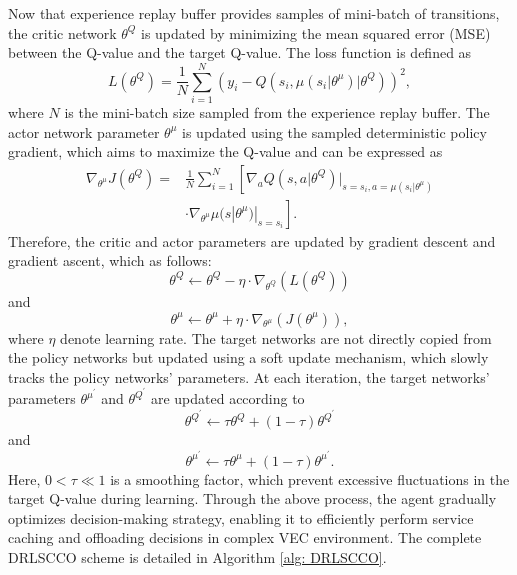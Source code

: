 \documentclass[lettersize,journal]{IEEEtran}
\begin{document}
Now that experience replay buffer provides samples of mini-batch of transitions, 
the critic network $ \theta^{Q} $ is updated by minimizing the mean squared error (MSE) between the  Q-value and the target Q-value. The loss function is defined as
\begin{equation}
	\label{equ: loss function for update critic sitaQ}
	L(\theta^{Q}) = \frac{1}{N}\sum_{i=1}^{N}\left( y_i - Q \left( s_i, \mu\left( s_i|\theta^{\mu} \right)|\theta^{Q} \right) \right)^2,
\end{equation}
where $ N $ is the mini-batch size sampled from the experience replay buffer.
The actor network parameter $ \theta^{\mu}$ is updated using the sampled deterministic  policy gradient, which aims to maximize the Q-value and can be expressed as
\begin{equation}
	\label{equ: policy gradient ascent for update actor sitamu}
	\begin{aligned}
		\nabla_{\theta^{\mu}} J(\theta^{Q})= & \frac{1}{N}\sum_{i=1}^{N}\left[ \nabla_{a}Q\left( s,a|\theta^{Q} \right)|_{s=s_i,a=\mu(s_i|\theta^{\mu})} 	\right.		\\
		& \left. \cdot \nabla_{\theta^{\mu}}\mu (s|\theta^{\mu})|_{s=s_i} \right].
	\end{aligned}
\end{equation}
Therefore, the critic and actor parameters are updated by gradient descent and gradient ascent, which as follows:  
\begin{equation}
	\theta^{Q} \leftarrow \theta^{Q} - \eta \cdot \nabla_{\theta^{Q}}(L(\theta^{Q}))
\end{equation}
and
\begin{equation}
	\theta^{\mu} \leftarrow \theta^{\mu} + \eta \cdot \nabla_{\theta^{\mu}}(J(\theta^{\mu})),
\end{equation}
where $ \eta $ denote learning rate.
The target networks are not directly copied from the policy networks but updated using a soft update mechanism, which slowly tracks the policy networks' parameters. At each iteration, the target networks' parameters $ \theta^{\mu^{\prime}} $ and $ \theta^{Q^{\prime}} $ are updated according to
\begin{equation}
	\label{equ: target1}
	\theta^{Q^{\prime}} \leftarrow \tau \theta^{Q} + (1-\tau)\theta^{Q^{\prime}}
\end{equation}
and
\begin{equation}
	\label{equ: target2}
	\theta^{\mu^{\prime}} \leftarrow \tau \theta^{\mu} + (1-\tau)\theta^{\mu^{\prime}}.
\end{equation}
Here, $ 0 < \tau \ll 1 $ is a smoothing factor, which prevent excessive fluctuations in the target Q-value during learning.  
Through the above process, the agent gradually optimizes decision-making strategy, enabling it to efficiently perform service caching and   offloading  decisions in complex VEC environment. The complete DRLSCCO scheme is detailed in Algorithm \ref{alg: DRLSCCO}.
\end{document}
